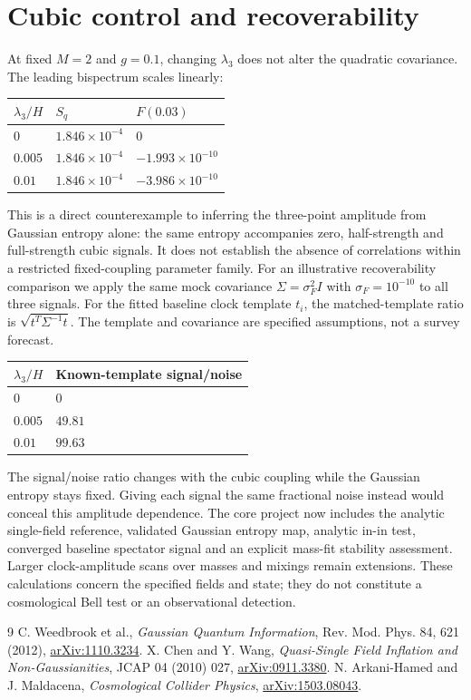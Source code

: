 \documentclass[11pt,a4paper]{article}
\begin{document}
\section{Cubic control and recoverability}
At fixed $M=2$ and $g=0.1$, changing $\lambda_3$ does not alter the quadratic covariance. The leading bispectrum scales linearly:
\begin{center}\small\begin{tabular}{lll}\toprule $\lambda_3/H$ & $S_q$ & $F(0.03)$\\\midrule
$0$ & $1.846\times10^{-4}$ & $0$\\
$0.005$ & $1.846\times10^{-4}$ & $-1.993\times10^{-10}$\\
$0.01$ & $1.846\times10^{-4}$ & $-3.986\times10^{-10}$\\\bottomrule\end{tabular}\end{center}
This is a direct counterexample to inferring the three-point amplitude from Gaussian entropy alone: the same entropy accompanies zero, half-strength and full-strength cubic signals. It does not establish the absence of correlations within a restricted fixed-coupling parameter family.
For an illustrative recoverability comparison we apply the same mock covariance $\Sigma=\sigma_F^2 I$ with $\sigma_F=10^{-10}$ to all three signals. For the fitted baseline clock template $t_i$, the matched-template ratio is $\sqrt{t^T\Sigma^{-1}t}$. The template and covariance are specified assumptions, not a survey forecast.
\begin{center}\small\begin{tabular}{ll}\toprule $\lambda_3/H$ & Known-template signal/noise\\\midrule
$0$ & $0$\\
$0.005$ & $49.81$\\
$0.01$ & $99.63$\\\bottomrule\end{tabular}\end{center}
The signal/noise ratio changes with the cubic coupling while the Gaussian entropy stays fixed. Giving each signal the same fractional noise instead would conceal this amplitude dependence.
The core project now includes the analytic single-field reference, validated Gaussian entropy map, analytic in-in test, converged baseline spectator signal and an explicit mass-fit stability assessment. Larger clock-amplitude scans over masses and mixings remain extensions. These calculations concern the specified fields and state; they do not constitute a cosmological Bell test or an observational detection.\begin{thebibliography}{9}\small
{} C. Weedbrook et al., \emph{Gaussian Quantum Information}, Rev. Mod. Phys. 84, 621 (2012), \href{https://arxiv.org/abs/1110.3234}{arXiv:1110.3234}.
 X. Chen and Y. Wang, \emph{Quasi-Single Field Inflation and Non-Gaussianities}, JCAP 04 (2010) 027, \href{https://arxiv.org/abs/0911.3380}{arXiv:0911.3380}.
 N. Arkani-Hamed and J. Maldacena, \emph{Cosmological Collider Physics}, \href{https://arxiv.org/abs/1503.08043}{arXiv:1503.08043}.\end{thebibliography}
\end{document}
